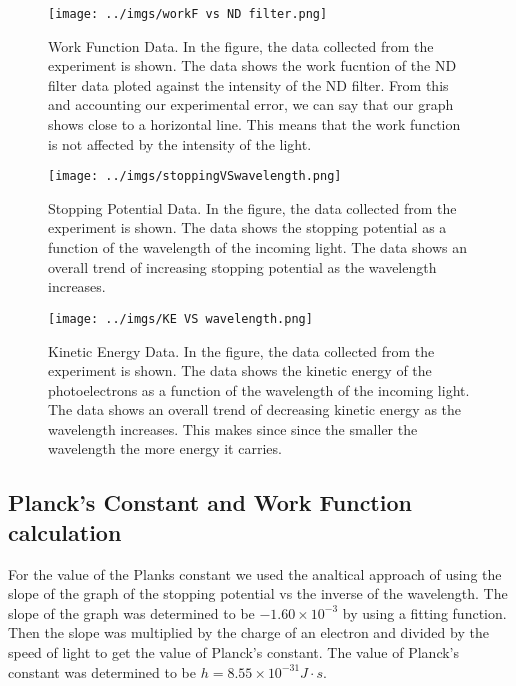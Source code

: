 \documentclass[12pt]{article}
\begin{document}
        \begin{figure}[!h]
                \centering
                \texttt{[image: ../imgs/workF vs ND filter.png]}
                \caption{Work Function Data. In the figure, the data collected from the experiment is shown. The data shows the
                work fucntion of the ND filter data ploted against the intensity of the ND filter. From this and accounting our
                experimental error, we can say that our graph shows close to a horizontal line. This means that the work function
                is not affected by the intensity of the light.}
                \label{fig: ND Work Function Data}
        \end{figure}

        \begin{figure}[!h]
                \centering
                \texttt{[image: ../imgs/stoppingVSwavelength.png]}
                \caption{Stopping Potential Data. In the figure, the data collected from the experiment is shown. The data shows 
                the stopping potential as a function of the wavelength of the incoming light. The data shows an overall trend of
                increasing stopping potential as the wavelength increases.}
                \label{fig: Stopping Potential vs Wavelength Data}
        \end{figure}

        \begin{figure}[!h]
                \centering
                \texttt{[image: ../imgs/KE VS wavelength.png]}
                \caption{Kinetic Energy Data. In the figure, the data collected from the experiment is shown. The data shows the 
                kinetic energy of the photoelectrons as a function of the wavelength of the incoming light. The data shows an overall trend of
                decreasing kinetic energy as the wavelength increases. This makes since since the smaller the wavelength the more energy it carries.}
        \end{figure}

        \subsection{Planck's Constant and Work Function calculation}

        For the value of the Planks constant we used the analtical approach of using the slope of the graph of the stopping potential vs the inverse of the wavelength.
        The slope of the graph was determined to be \(  -1.60 \times 10^{-3} \) by using a fitting function. Then the slope was multiplied by the charge of an electron and divided by the speed of light to get the value of Planck's constant.
        The value of Planck's constant was determined to be \( h = 8.55 \times 10^{-31} J \cdot s \). 
        
\end{document}

